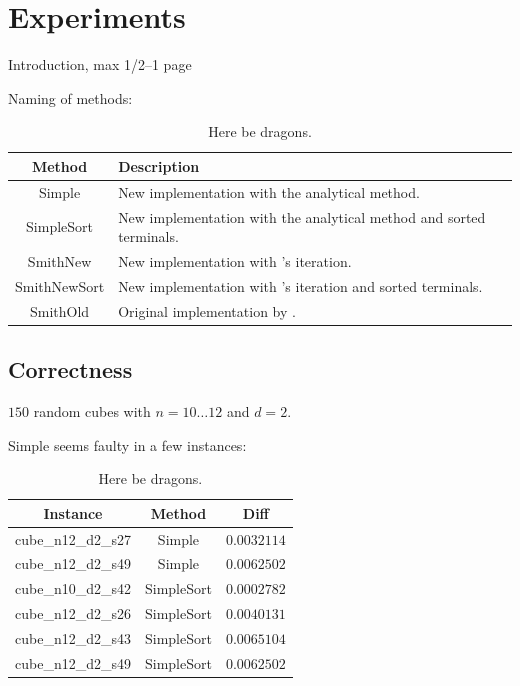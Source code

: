 {
\abnormalparskip{0pt}
\chapter{Experiments}
\label{cha:experiments}
}

Introduction, max 1/2--1 page

Naming of methods:
\begin{table}[htbp]
  \centering
  \begin{tabular}{cp{9cm}}
    \toprule
    Method       & Description                                      \\
    \midrule
    Simple       & New implementation with the analytical method.   \\
    SimpleSort   & New implementation with the analytical method and sorted
                   terminals.                                       \\
    SmithNew     & New implementation with \citeauthor{smith1992}'s
                   iteration.                                       \\
    SmithNewSort & New implementation with \citeauthor{smith1992}'s iteration
                   and sorted terminals.                            \\
    SmithOld     & Original implementation by \textcite{smith1992}. \\
    \bottomrule
  \end{tabular}
  \caption[Here be dragons]{Here be dragons.\label{tab:method-names}}
\end{table}

\section{Correctness}
\label{sec:correctness}

$150$ random cubes with $n = 10 \ldots 12$ and $d = 2$.

Simple seems faulty in a few instances:

\begin{table}[htbp]
  \centering
  \begin{tabular}{ccc}
    \toprule
    Instance           & Method     & Diff        \\
    \midrule
    cube\_n12\_d2\_s27 & Simple     & $0.0032114$ \\
    cube\_n12\_d2\_s49 & Simple     & $0.0062502$ \\
    cube\_n10\_d2\_s42 & SimpleSort & $0.0002782$ \\
    cube\_n12\_d2\_s26 & SimpleSort & $0.0040131$ \\
    cube\_n12\_d2\_s43 & SimpleSort & $0.0065104$ \\
    cube\_n12\_d2\_s49 & SimpleSort & $0.0062502$ \\
    \bottomrule
  \end{tabular}
  \caption[Here be dragons]{Here be dragons.\label{tab:correctness-errors}}
\end{table}

